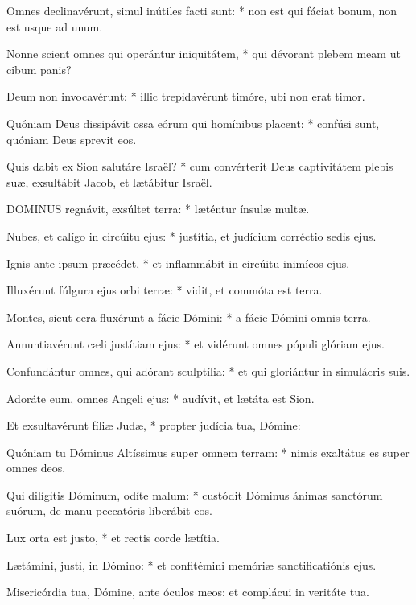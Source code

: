 Omnes declinavérunt, simul inútiles facti sunt: * non est qui fáciat bonum, non est usque ad unum.

Nonne scient omnes qui operántur iniquitátem, * qui dévorant plebem meam ut cibum panis?

Deum non invocavérunt: * illic trepidavérunt timóre, ubi non erat timor.

Quóniam Deus dissipávit ossa eórum qui homínibus placent: * confúsi sunt, quóniam Deus sprevit eos.

Quis dabit ex Sion salutáre Israël? * cum convérterit Deus captivitátem plebis suæ, exsultábit Jacob, et lætábitur Israël.



\lettrine[lines=2]{D}{OMINUS} regnávit, exsúltet terra: * læténtur ínsulæ multæ.

Nubes, et calígo in circúitu ejus: * justítia, et judícium corréctio sedis ejus.

Ignis ante ipsum præcédet, * et inflammábit in circúitu inimícos ejus.

Illuxérunt fúlgura ejus orbi terræ: * vidit, et commóta est terra.

Montes, sicut cera fluxérunt a fácie Dómini: * a fácie Dómini omnis terra.

Annuntiavérunt cæli justítiam ejus: * et vidérunt omnes pópuli glóriam ejus.

Confundántur omnes, qui adórant sculptília: * et qui gloriántur in simulácris suis.

Adoráte eum, omnes Angeli ejus: * audívit, et lætáta est Sion.

Et exsultavérunt fíliæ Judæ, * propter judícia tua, Dómine:

Quóniam tu Dóminus Altíssimus super omnem terram: * nimis exaltátus es super omnes deos.

Qui dilígitis Dóminum, odíte malum: * custódit Dóminus ánimas sanctórum suórum, de manu peccatóris liberábit eos.

Lux orta est justo, * et rectis corde lætítia.

Lætámini, justi, in Dómino: * et confitémini memóriæ sanctificatiónis ejus.


  Misericórdia tua, Dómine, ante óculos meos: et complácui in veritáte tua.


